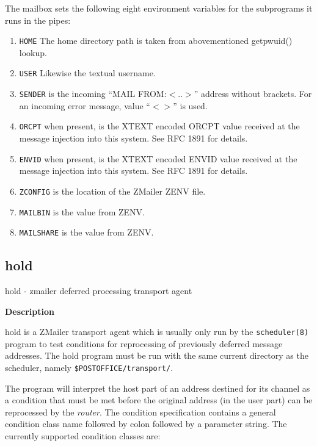 The mailbox sets the following eight environment variables for the subprograms it runs 
in the pipes:
\begin{enumerate}
\item {\tt HOME} The home directory path is taken from abovementioned getpwuid()
lookup.
\item {\tt USER} Likewise the textual username.
\item {\tt SENDER} is the incoming ``MAIL FROM:{\(<\)}..{\(>\)}'' address without brackets. For
an incoming error message, value ``{\(<\)}{\(>\)}'' is used.
\item {\tt ORCPT} when present, is the XTEXT encoded ORCPT value received at the
message injection into this system. See RFC 1891 for details.
\item {\tt ENVID} when present, is the XTEXT encoded ENVID value received at the
message injection into this system. See RFC 1891 for details.
\item {\tt ZCONFIG} is the location of the ZMailer ZENV file.
\item {\tt MAILBIN} is the value from ZENV.
\item {\tt MAILSHARE} is the value from ZENV.
\end{enumerate}









\subsection{hold}



hold - zmailer deferred processing transport agent

{\bf Description}

hold is a ZMailer transport agent which is usually only
run by the {\tt scheduler(8)} program to test conditions for
reprocessing of previously deferred message addresses.
The hold program must be run with the same current directory 
as the scheduler, namely {\tt \$POSTOFFICE/transport/}.

The program will interpret the host part of an address
destined for its channel as a condition that must be met
before the original address (in the user part) can be
reprocessed by the {\em router\/}. The condition specification
contains a general condition class name followed by colon
followed by a parameter string. The currently supported
condition classes are:

